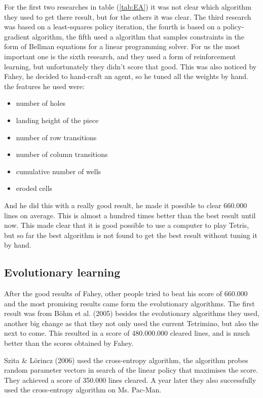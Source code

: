 \documentclass{report}
\begin{document}
For the first two researches in table (\ref{tab:EA}) it was not clear which algorithm they used to get there result, but for the others it was clear. The third research was based on a least-squares policy iteration, the fourth is based on a policy-gradient algorithm, the fifth used a algorithm that samples constraints in the form of Bellman equations for a linear programming solver. For us the most important one is the sixth research, and they used a form of reinforcement learning, but unfortunately they didn't score that good. This was also noticed by Fahey, he decided to hand-craft an agent, so he tuned all the weights by hand. the features he used were:
\begin{itemize}
    \item number of holes
    \item landing height of the piece
    \item number of row transitions
    \item number of column transitions
    \item cumulative number of wells
    \item eroded cells
\end{itemize}

And he did this with a really good result, he made it possible to clear 660.000 lines on average. This is almost a hundred times better than the best result until now. This made clear that it is good possible to use a computer to play Tetris, but so far the best algorithm is not found to get the best result without tuning it by hand.

\subsection{Evolutionary learning}
After the good results of Fahey, other people tried to beat his score of 660.000 and the most promising results came form the evolutionary algorithms. The first result was from B\"ohm et al. (2005) besides the evolutionary algorithms they used, another big change as that they not only used the current Tetrimino, but also the next to come. This resulted in a score of 480.000.000 cleared lines, and is much better than the scores obtained by Fahey.

Szita \& L\"orincz (2006) used the cross-entropy algorithm, the algorithm probes random parameter vectors in search of the linear policy that maximises the score. They achieved a score of 350.000 lines cleared. A year later they also successfully used the cross-entropy algorithm on Ms. Pac-Man.
\end{document}
